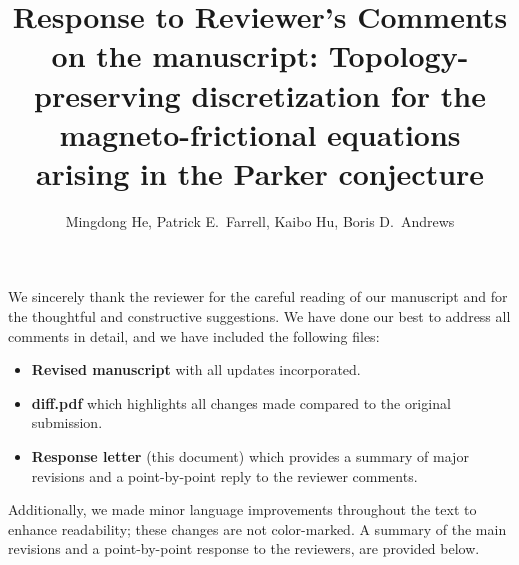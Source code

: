 \documentclass{article}
\theoremstyle{definition}
\begin{document}

\title{Response to Reviewer's Comments on the manuscript: Topology-preserving discretization for
the magneto-frictional equations
arising in the Parker conjecture} %
\author{Mingdong He, Patrick E.~Farrell, Kaibo Hu, Boris D.~Andrews} 

\maketitle
We sincerely thank the reviewer for the careful reading of our manuscript and for the thoughtful and constructive suggestions. We have done our best to address all comments in detail, and we have included the following files:
\begin{itemize}
    \item \textbf{Revised manuscript} with all updates incorporated.
    \item \textbf{diff.pdf} which highlights all changes made compared to the original submission.
    \item \textbf{Response letter} (this document) which provides a summary of major revisions and a point-by-point reply to the reviewer comments. 
\end{itemize}
Additionally, we made minor language improvements throughout the text to enhance readability; these changes are not color-marked. A summary of the main revisions and a point-by-point response to the reviewers, are provided below.

\setlength{\parindent}{0pt}
\setlength{\parskip}{1em}
%
\end{document}

